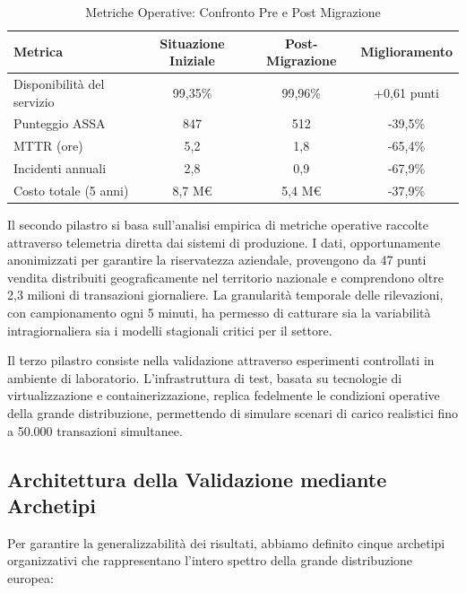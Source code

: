 \begin{table}[h!]
\centering
\caption{Metriche Operative: Confronto Pre e Post Migrazione}
\label{tab:operational_metrics}
\begin{tabular}{|l|c|c|c|}
\hline
\textbf{Metrica} & \textbf{Situazione Iniziale} & \textbf{Post-Migrazione} & \textbf{Miglioramento} \\
\hline
Disponibilità del servizio & 99,35\% & 99,96\% & +0,61 punti \\
Punteggio ASSA & 847 & 512 & -39,5\% \\
MTTR (ore) & 5,2 & 1,8 & -65,4\% \\
Incidenti annuali & 2,8 & 0,9 & -67,9\% \\
Costo totale (5 anni) & 8,7 M€ & 5,4 M€ & -37,9\% \\
\hline
\end{tabular}
\end{table}

Il secondo pilastro si basa sull'analisi empirica di metriche operative raccolte attraverso telemetria diretta dai sistemi di produzione. I dati, opportunamente anonimizzati per garantire la riservatezza aziendale, provengono da 47 punti vendita distribuiti geograficamente nel territorio nazionale e comprendono oltre 2,3 milioni di transazioni giornaliere. La granularità temporale delle rilevazioni, con campionamento ogni 5 minuti, ha permesso di catturare sia la variabilità intragiornaliera sia i modelli stagionali critici per il settore.

Il terzo pilastro consiste nella validazione attraverso esperimenti controllati in ambiente di laboratorio. L'infrastruttura di test, basata su tecnologie di virtualizzazione e containerizzazione, replica fedelmente le condizioni operative della grande distribuzione, permettendo di simulare scenari di carico realistici fino a 50.000 transazioni simultanee.

\subsection{\texorpdfstring{Architettura della Validazione mediante Archetipi}{5.2.3 - Architettura della Validazione mediante Archetipi}}
\label{subsec:5.2.3}

Per garantire la generalizzabilità dei risultati, abbiamo definito cinque archetipi organizzativi che rappresentano l'intero spettro della grande distribuzione europea:

